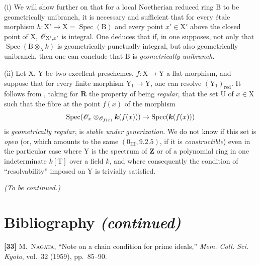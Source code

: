 \begin{remarks}[7.9.10]
\label{IV.7.9.10}
(i) We will show further on  that for a local Noetherian reduced ring $\mathrm{B}$ to be geometrically unibranch, it is necessary and sufficient that for every étale morphism $h:\mathrm{X}'\to\mathrm{X}=\operatorname{Spec}(\mathrm{B})$ and every point $x'\in\mathrm{X}'$ above the closed point of $\mathrm{X}$, $\mathscr{O}_{\mathrm{X}',x'}$ is integral. One deduces that if, in  one supposes, not only that $\operatorname{Spec}(\mathrm{B}\otimes_\mathrm{A} k)$ is geometrically punctually integral, but also geometrically unibranch, then one can conclude that $\mathrm{B}$ is \emph{geometrically unibranch}.


(ii) Let $\mathrm{X}$, $\mathrm{Y}$ be two excellent preschemes, $f:\mathrm{X}\to\mathrm{Y}$ a flat morphism, and suppose that for every finite morphism $\mathrm{Y}_1\to\mathrm{Y}$, one can resolve $(\mathrm{Y}_1)_{\mathrm{red}}$. It follows from , taking for $\boldsymbol{R}$ the property of being \emph{regular}, that the set $\mathrm{U}$ of $x\in\mathrm{X}$ such that the fibre at the point $f(x)$ of the morphism
\[
  \operatorname{Spec}(\mathscr{O}_x\otimes_{\mathscr{O}_{f(x)}}\boldsymbol{k}(f(x)))\to\operatorname{Spec}(\boldsymbol{k}(f(x)))
\]
is \emph{geometrically regular}, is \emph{stable under generization}. We do not know if this set is \emph{open} (or, which amounts to the same $(0_{\mathrm{III}}, 9.2.5)$, if it is \emph{constructible}) even in the particular case where $\mathrm{Y}$ is the spectrum of $\mathbf{Z}$ or of a polynomial ring in one indeterminate $k[\mathrm{T}]$ over a field $k$, and where consequently the condition of ``resolvability'' imposed on $\mathrm{Y}$ is trivially satisfied.
\end{remarks}

\begin{center}
\emph{(To be continued.)}
\end{center}

\clearpage
{}
{}
\section*{Bibliography \textnormal{\emph{(continued)}}}

\begingroup
\small
\setlength{\parindent}{0pt}
\setlength{\parskip}{4pt}

\textbf{[33]} M.~\textsc{Nagata}, ``Note on a chain condition for prime
ideals,'' \emph{Mem. Coll. Sci. Kyoto}, vol.~32 (1959), pp.~85--90.

